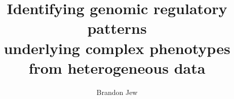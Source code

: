 \documentclass [PhD] {uclathes}
\title          {Identifying genomic regulatory patterns \\
                 underlying complex phenotypes from heterogeneous data}
\author         {Brandon Jew}
\begin{document}
\makeintropages

%
%








\end{document}
